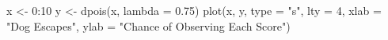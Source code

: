 \begin{Schunk}
\begin{Sinput}
 x <- 0:10
 y <- dpois(x, lambda = 0.75)
 plot(x, y, type = "s", lty = 4, xlab = "Dog Escapes", ylab = "Chance of Observing Each Score")
\end{Sinput}
\end{Schunk}

